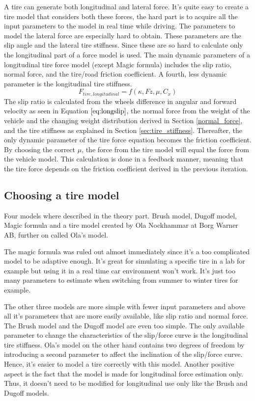 A tire can generate both longitudinal and lateral force. It's quite easy to create a tire model that considers both these forces, the hard part is to acquire all the input parameters to the model in real time while driving. The parameters to model the lateral force are especially hard to obtain. These parameters are the slip angle and the lateral tire stiffness. Since these are so hard to calculate only the longitudinal part of a force model is used. The main dynamic parameters of a longitudinal tire force model (except Magic formula) includes the slip ratio, normal force, and the tire/road friction coefficient. A fourth, less dynamic parameter is the longitudinal tire stiffness. 
\begin{equation}
F_{tire, longitudinal} = f(\kappa, Fz, \mu, C_{x})
\end{equation}
The slip ratio is calculated from the wheels difference in angular and forward velocity as seen in Equation $ \ref{eq:longslip} $, the normal force from the weight of the vehicle and the changing weight distribution derived in  Section \ref{normal_force}, and the tire stiffness as explained in Section \ref{sec:tire_stiffness}. Thereafter, the only dynamic parameter of the tire force equation becomes the friction coefficient. By choosing the correct $ \mu $, the force from the tire model will equal the force from the vehicle model. This calculation is done in a feedback manner, meaning that the tire force depends on the friction coefficient derived in the previous iteration.

\subsection{Choosing a tire model}
Four models where described in the theory part. Brush model, Dugoff model, Magic formula and a tire model created by Ola Nockhammar at Borg Warner AB, further on called Ola's model.

The magic formula was ruled out almost immediately since it's a too complicated model to be adaptive enough. It's great for simulating a specific tire in a lab for example but using it in a real time car environment won't work. It's just too many parameters to estimate when switching from summer to winter tires for example. 

The other three models are more simple with fewer input parameters and above all it's parameters that are more easily available, like slip ratio and normal force. The Brush model and the Dugoff model are even too simple. The only available parameter to change the characteristics of the slip/force curve is the longitudinal tire stiffness. Ola's model on the other hand contains two degrees of freedom by introducing a second parameter to affect the inclination of the slip/force curve. Hence, it's easier to model a tire correctly with this model. Another positive aspect is the fact that the model is made for longitudinal force estimation only. Thus, it doesn't need to be modified for longitudinal use only like the Brush and Dugoff models. 

